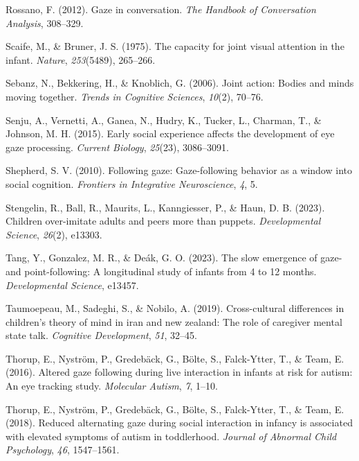 \documentclass[
  man,floatsintext]{apa6}
\newlength{\cslhangindent}
\newlength{\cslentryspacingunit} %
\newenvironment{CSLReferences}[2] %
 {%
  \setlength{\parindent}{0pt}
  \ifodd #1
  \let\oldpar\par
  \def\par{\hangindent=\cslhangindent\oldpar}
  \fi
  \setlength{\parskip}{#2\cslentryspacingunit}
 }%
 {}
\begin{document}
\begin{CSLReferences}{1}{0}
\leavevmode{}%
Rossano, F. (2012). Gaze in conversation. \emph{The Handbook of Conversation Analysis}, 308--329.

\leavevmode{}%
Scaife, M., \& Bruner, J. S. (1975). The capacity for joint visual attention in the infant. \emph{Nature}, \emph{253}(5489), 265--266.

\leavevmode{}%
Sebanz, N., Bekkering, H., \& Knoblich, G. (2006). Joint action: Bodies and minds moving together. \emph{Trends in Cognitive Sciences}, \emph{10}(2), 70--76.

\leavevmode{}%
Senju, A., Vernetti, A., Ganea, N., Hudry, K., Tucker, L., Charman, T., \& Johnson, M. H. (2015). Early social experience affects the development of eye gaze processing. \emph{Current Biology}, \emph{25}(23), 3086--3091.

\leavevmode{}%
Shepherd, S. V. (2010). Following gaze: Gaze-following behavior as a window into social cognition. \emph{Frontiers in Integrative Neuroscience}, \emph{4}, 5.

\leavevmode{}%
Stengelin, R., Ball, R., Maurits, L., Kanngiesser, P., \& Haun, D. B. (2023). Children over-imitate adults and peers more than puppets. \emph{Developmental Science}, \emph{26}(2), e13303.

\leavevmode{}%
Tang, Y., Gonzalez, M. R., \& Deák, G. O. (2023). The slow emergence of gaze-and point-following: A longitudinal study of infants from 4 to 12 months. \emph{Developmental Science}, e13457.

\leavevmode{}%
Taumoepeau, M., Sadeghi, S., \& Nobilo, A. (2019). Cross-cultural differences in children's theory of mind in iran and new zealand: The role of caregiver mental state talk. \emph{Cognitive Development}, \emph{51}, 32--45.

\leavevmode{}%
Thorup, E., Nyström, P., Gredebäck, G., Bölte, S., Falck-Ytter, T., \& Team, E. (2016). Altered gaze following during live interaction in infants at risk for autism: An eye tracking study. \emph{Molecular Autism}, \emph{7}, 1--10.

\leavevmode{}%
Thorup, E., Nyström, P., Gredebäck, G., Bölte, S., Falck-Ytter, T., \& Team, E. (2018). Reduced alternating gaze during social interaction in infancy is associated with elevated symptoms of autism in toddlerhood. \emph{Journal of Abnormal Child Psychology}, \emph{46}, 1547--1561.


\end{CSLReferences}
\end{document}
